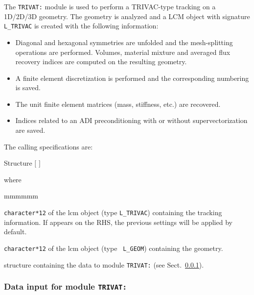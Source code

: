 The {\tt TRIVAT:} module is used to perform a TRIVAC-type {\sc tracking} on a
1D/2D/3D geometry.\cite{SVAT1,SVAT2,MCFD,Trivac,mixte-dual,benaboud} The
geometry is analyzed and a LCM object with signature {\tt L\_TRIVAC} is
created with the following information:

\begin{itemize}
\item Diagonal and hexagonal symmetries are unfolded and the mesh-splitting 
operations are performed. Volumes, material mixture and averaged flux recovery
indices are computed on the resulting geometry. \item A finite element
discretization is performed and the corresponding numbering is saved. \item The
unit finite element matrices (mass, stiffness, etc.) are recovered. \item
Indices related to an ADI preconditioning with or without supervectorization
are saved. \end{itemize}

The calling specifications are:

\begin{DataStructure}{Structure }
 \moc{:=}  $[$  $]$   \moc{::} 
\end{DataStructure}

\goodbreak
\noindent where
\begin{ListeDeDescription}{mmmmmm}

\item[\dusa{TRACK}] {\tt character*12} of the {\sc lcm} object (type {\tt L\_TRIVAC}) 
containing the {\sc tracking} information. If  appears on the RHS, the
previous settings will be applied by default.

\item[\dusa{GEOM}] {\tt character*12} of the {\sc lcm} object (type {\tt
L\_GEOM}) containing the geometry.

\item[\dstr{trivat\_data}] structure containing  the data to module {\tt TRIVAT:} (see Sect.~\ref{sect:trivat_data}).

\end{ListeDeDescription}

\vskip 0.2cm

\subsubsection{Data input for module {\tt TRIVAT:}}\label{sect:trivat_data}

